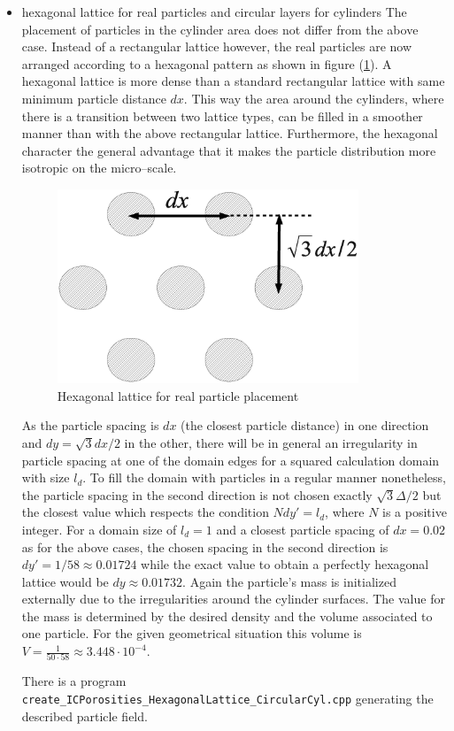 \documentclass[11pt,a4paper,twoside]{report}
\begin{document}
\begin{itemize}
\item hexagonal lattice for real particles and circular layers for cylinders
The placement of particles in the cylinder area does not differ from the above case. Instead of a rectangular lattice however, the real particles are now arranged according to a hexagonal pattern  as shown in figure (\ref{fig:HexagonalLattice}). A hexagonal lattice is more dense than a standard rectangular lattice with same minimum particle distance $dx$. This way the area around the cylinders, where there is a transition between two lattice types, can be filled in a smoother manner than with the above rectangular lattice. Furthermore, the hexagonal character the general advantage that 
it makes the particle distribution more isotropic on the micro--scale.

\begin{figure}[!htbp]
  \centering
     \includegraphics[width=9cm]{Graphics/SimuSetup/HexagonalLattice}
  \caption{Hexagonal lattice for real particle placement}
  \label{fig:HexagonalLattice}
\end{figure}

As the particle spacing is $dx$ (the closest particle distance) in one direction and $dy=\sqrt{3}dx/2$ in the other, there will be in general an irregularity in particle spacing at one of the domain edges for a squared calculation domain with size $l_d$. To fill the domain with particles in a regular manner nonetheless, the particle spacing in the second direction is not chosen exactly $\sqrt{3}\Delta/2$ but the closest value which respects the condition $N dy'=l_d$, where $N$ is a positive integer. For a domain size of $l_d=1$ and a closest particle spacing of $dx=0.02$ as for the above cases, the chosen spacing in the second direction is $dy'=1/58\approx0.01724$ while the exact value to obtain a perfectly hexagonal lattice would be $dy\approx0.01732$. 
Again the particle's mass is initialized externally due to the irregularities around the cylinder surfaces. The value for the mass is determined by the desired density and the volume associated to one particle. For the given geometrical situation this volume is $V=\frac{1}{50\cdot58}\approx3.448\cdot10^{-4}$.

There is a program {\tt create\_ICPorosities\_HexagonalLattice\_CircularCyl.cpp} generating the described particle field.

\end{itemize}
\end{document}
